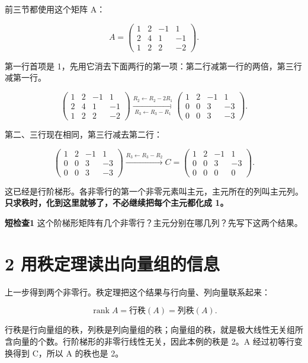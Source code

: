 \documentclass[
  11pt,
  a4paper,
  fontset=fandol]{ctexart}
\begin{document}
前三节都使用这个矩阵 A：

\[A=\begin{pmatrix}
1&2&-1&1\\
2&4&1&-1\\
1&2&2&-2
\end{pmatrix}.\]

第一行首项是
1，先用它消去下面两行的第一项：第二行减第一行的两倍，第三行减第一行。

\[\begin{pmatrix}
1&2&-1&1\\2&4&1&-1\\1&2&2&-2
\end{pmatrix}
\xrightarrow[R_3\leftarrow R_3-R_1]{R_2\leftarrow R_2-2R_1}
\begin{pmatrix}
1&2&-1&1\\0&0&3&-3\\0&0&3&-3
\end{pmatrix}.\]

第二、三行现在相同，第三行减去第二行：

\[\begin{pmatrix}
1&2&-1&1\\0&0&3&-3\\0&0&3&-3
\end{pmatrix}
\xrightarrow{R_3\leftarrow R_3-R_2}
C=\begin{pmatrix}
1&2&-1&1\\0&0&3&-3\\0&0&0&0
\end{pmatrix}.\]

这已经是行阶梯形。各非零行的第一个非零元素叫主元，主元所在的列叫主元列。\textbf{只求秩时，化到这里就够了，不必继续把每个主元都化成
1。}

\textbf{短检查1}
这个阶梯形矩阵有几个非零行？主元分别在哪几列？先写下这两个结果。


\section{2
用秩定理读出向量组的信息}\label{2-ux7528ux79e9ux5b9aux7406ux8bfbux51faux5411ux91cfux7ec4ux7684ux4fe1ux606f}

上一步得到两个非零行。秩定理把这个结果与行向量、列向量联系起来：

\[\boxed{\operatorname{rank}A=\text{行秩}(A)=\text{列秩}(A).}\]

行秩是行向量组的秩，列秩是列向量组的秩；向量组的秩，就是极大线性无关组所含向量的个数。行阶梯形的非零行线性无关，因此本例的秩是
2。A 经过初等行变换得到 C，所以 A 的秩也是 2。
\end{document}

